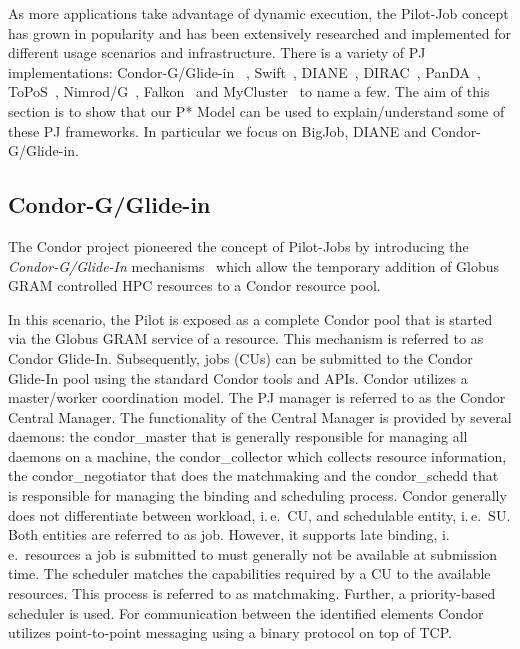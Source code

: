 \documentclass[conference,final]{IEEEtran}
\newcommand{\jhanote}[1]{ {\textcolor{red} { ***shantenu: #1 }}}
\newcommand{\jhanote}[1]{}
\newcommand{\pilot}{Pilot\xspace}
\newcommand{\cu}{CU\xspace}
\newcommand{\upp}{\vspace*{-0.5em}}
\begin{document}
As more applications take advantage of dynamic execution, the
Pilot-Job concept has grown in popularity and has been extensively
researched and implemented for different usage scenarios and
infrastructure. There is a variety of PJ implementations:
Condor-G/Glide-in~\cite{condor-g}
, Swift~\cite{Wilde2011},
DIANE~\cite{Moscicki:908910}, DIRAC~\cite{1742-6596-219-6-062049},
PanDA~\cite{1742-6596-219-6-062041}, ToPoS~\cite{topos},
Nimrod/G~\cite{10.1109/HPC.2000.846563}, Falkon~\cite{1362680} and
MyCluster~\cite{1652061} to name a few. The aim of this section is to
show that our P* Model can be used to explain/understand some of these
PJ frameworks. In particular we focus on BigJob, DIANE and Condor-G/Glide-in.




\upp
\subsection{Condor-G/Glide-in\upp\upp}

The Condor project pioneered the concept of Pilot-Jobs by introducing 
the \textit{Condor-G/Glide-In} mechanisms~\cite{condor-g} which allow 
the temporary addition of Globus GRAM controlled HPC resources to a 
Condor resource pool.

In this scenario, the \pilot is exposed as a complete Condor pool that is started 
via the Globus GRAM service of a resource. This mechanism is referred to as Condor
Glide-In. Subsequently, jobs (CUs) can be submitted to the Condor Glide-In pool
using the standard Condor tools and APIs. Condor utilizes a
master/worker coordination model. The PJ manager is referred to as the
Condor Central Manager. The functionality of the Central Manager is
provided by several daemons: the condor\_master that is generally
responsible for managing all daemons on a machine, the
condor\_collector which collects resource information, the
condor\_negotiator that does the matchmaking and the condor\_schedd
that is responsible for managing the binding and scheduling
process. Condor generally does not differentiate between workload,
i.\,e.\ \cu, and schedulable entity, i.\,e.\ SU. Both entities are
referred to as job. However, it supports late binding, i.\,e.\
resources a job is submitted to must generally not be available at
submission time. The scheduler matches the capabilities required by a
\cu to the available resources. This process is referred to as
matchmaking. Further, a priority-based scheduler is used. For
communication between the identified elements Condor utilizes
point-to-point messaging using a binary protocol on top of TCP.
\end{document}
